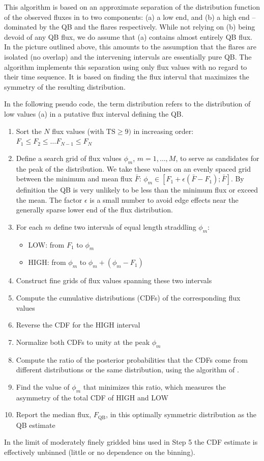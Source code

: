 \documentclass[twocolumn,linenumbers]{aastex62}
\begin{document}
This algorithm is based on an approximate 
separation of the distribution function of the observed
fluxes in to two components: 
(a) a low end, and (b) a high end -- dominated by
the QB and the flares respectively.
While not relying on (b) being devoid of any QB flux,
we do assume that (a) contains almost entirely QB flux.
In the picture outlined above, this amounts to the
assumption that the flares are isolated (no overlap) 
and the intervening intervals are essentially pure QB.
The algorithm implements this separation
using only flux values with no regard to 
their time sequence.  It is based on finding the
flux interval that maximizes the symmetry of 
the resulting distribution.


In the following pseudo code, the term distribution
refers to the distribution of low values (a) in a putative
flux interval defining the QB.
\begin{enumerate}
\item Sort the $N$ flux values (with $\mathrm{TS} \geqslant 9)$ in increasing order:
$F_{1} \leqslant F_{2} \leqslant \dots F_{N-1}   \leqslant F_{N} $
\item Define a search grid of flux values $\phi_{m}$, $m = 1,\ldots,M$, 
to serve as candidates for the peak of the distribution. We take these 
values on an evenly spaced grid between the minimum and mean flux $\bar{F}$:
$\phi_m \in [F_1 + \epsilon (\bar{F} - F_1); \bar{F}]$.
By definition the QB is very unlikely to be less than the
minimum flux or exceed the mean.
The factor $\epsilon$ is a small number to  avoid edge effects 
near the generally sparse lower end of the flux distribution.
\item For each $m$ define two intervals  of equal length straddling  $\phi_m$: 
    \begin{itemize}
    \item LOW: from $F_{1}$ to $\phi_m$
    \item HIGH: from $\phi_m$ to $\phi_m + (\phi_m - F_{1})$
    \end{itemize}

\item Construct fine grids of flux values spanning these two intervals
\item Compute the cumulative distributions (CDFs) of the
corresponding flux values 
\item Reverse the  CDF for the HIGH interval 
\item Normalize both CDFs to unity at the peak $\phi_m$
\item Compute the ratio of the posterior probabilities that the CDFs come from different distributions or the same distribution,  using the algorithm of \citet{Wolpert1996}.
\item Find the value of $\phi_m$ that minimizes this ratio, which measures the asymmetry of the total CDF of HIGH and LOW
\item Report the median flux, $F_\mathrm{QB}$, in this
optimally symmetric distribution as the QB estimate
\end{enumerate}
\noindent
In the limit of moderately finely gridded bins 
used in Step 5 the CDF estimate is effectively
unbinned (little or no dependence
on the binning).
\end{document}
